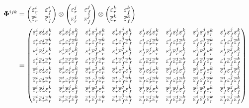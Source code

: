 \begin{align}
  \mathbf{\Phi}^{ijk} &=
  \begin{pmatrix}
  \real^i & \fake^i \\ \realbar^i & \fakebar^i
  \end{pmatrix} 
  \otimes
  \begin{pmatrix}
  \real^j & \fake^j \\ \realbar^j & \fakebar^j
  \end{pmatrix} 
  \otimes
  \begin{pmatrix}
  \real^k & \fake^k \\ \realbar^k & \fakebar^k
  \end{pmatrix} \\
  &=
  \begin{pmatrix} 
  \real^i\real^j\real^k  &
  \real^i\real^j\fake^k  &
  \real^i\fake^j\real^k  &
  \real^i\fake^j\fake^k  &
  \fake^i\real^j\real^k  &
  \fake^i\real^j\fake^k  &
  \fake^i\fake^j\real^k  &
  \fake^i\fake^j\fake^k  \\
  \real^i\real^j\realbar^k  &
  \real^i\real^j\fakebar^k  &
  \real^i\fake^j\realbar^k  &
  \real^i\fake^j\fakebar^k  &
  \fake^i\real^j\realbar^k  &
  \fake^i\real^j\fakebar^k  &
  \fake^i\fake^j\realbar^k  &
  \fake^i\fake^j\fakebar^k  \\
  \real^i\realbar^j\real^k  &
  \real^i\realbar^j\fake^k  &
  \real^i\fakebar^j\real^k  &
  \real^i\fakebar^j\fake^k  &
  \fake^i\realbar^j\real^k  &
  \fake^i\realbar^j\fake^k  &
  \fake^i\fakebar^j\real^k  &
  \fake^i\fakebar^j\fake^k  \\
  \real^i\realbar^j\realbar^k  &
  \real^i\realbar^j\fakebar^k  &
  \real^i\fakebar^j\realbar^k  &
  \real^i\fakebar^j\fakebar^k  &
  \fake^i\realbar^j\realbar^k  &
  \fake^i\realbar^j\fakebar^k  &
  \fake^i\fakebar^j\realbar^k  &
  \fake^i\fakebar^j\fakebar^k  \\
  \realbar^i\real^j\real^k  &
  \realbar^i\real^j\fake^k  &
  \realbar^i\fake^j\real^k  &
  \realbar^i\fake^j\fake^k  &
  \fakebar^i\real^j\real^k  &
  \fakebar^i\real^j\fake^k  &
  \fakebar^i\fake^j\real^k  &
  \fakebar^i\fake^j\fakebar^k  \\
  \realbar^i\real^j\realbar^k  &
  \realbar^i\real^j\fakebar^k  &
  \realbar^i\fake^j\realbar^k  &
  \realbar^i\fake^j\fakebar^k  &
  \fakebar^i\real^j\realbar^k  &
  \fakebar^i\real^j\fakebar^k  &
  \fakebar^i\fake^j\realbar^k  &
  \fakebar^i\fake^j\fakebar^k  \\
  \realbar^i\realbar^j\real^k  &
  \realbar^i\realbar^j\fake^k  &
  \realbar^i\fakebar^j\real^k  &
  \realbar^i\fakebar^j\fake^k  &
  \fakebar^i\realbar^j\real^k  &
  \fakebar^i\realbar^j\fake^k  &
  \fakebar^i\fakebar^j\real^k  &
  \fakebar^i\fakebar^j\fake^k  \\
  \realbar^i\realbar^j\realbar^k  &
  \realbar^i\realbar^j\fakebar^k  &
  \realbar^i\fakebar^j\realbar^k  &
  \realbar^i\fakebar^j\fakebar^k  &
  \fakebar^i\realbar^j\realbar^k  &
  \fakebar^i\realbar^j\fakebar^k  &
  \fakebar^i\fakebar^j\realbar^k  &
  \fakebar^i\fakebar^j\fakebar^k  
  \end{pmatrix} 
\end{align}
